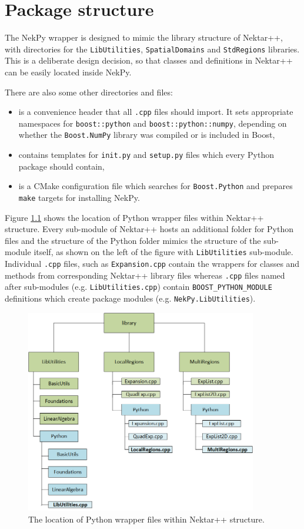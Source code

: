 \chapter{Package structure}

The NekPy wrapper is designed to mimic the library structure of Nektar++, with
directories for the \texttt{LibUtilities}, \texttt{SpatialDomains} and \texttt{StdRegions}
libraries. This is a deliberate design decision, so that classes and definitions
in Nektar++ can be easily located inside NekPy.

There are also some other directories and files:

\begin{itemize}
	\item {} is a convenience header that all 
		\texttt{.cpp} files should import. It sets appropriate namespaces for 
		\texttt{boost::python} and \texttt{boost::python::numpy}, depending on whether 
		the \texttt{Boost.NumPy} library was compiled or is included in Boost,
	\item {} contains templates for \texttt{init.py} and \texttt{setup.py}
		files which every Python package should contain,
	\item {} is a CMake configuration file which searches for
		\texttt{Boost.Python} and prepares \texttt{make} targets for installing NekPy.
\end{itemize}

Figure \ref{fig:package_str} shows the location of Python wrapper files within Nektar++ structure. 
Every sub-module of Nektar++ hosts an additional folder for Python files and the structure of the 
Python folder mimics the structure of the sub-module itself, as shown on the left of the figure 
with \texttt{LibUtilities} sub-module. Individual \texttt{.cpp} files, such as \texttt{Expansion.cpp} 
contain the wrappers for classes and methods from corresponding Nektar++ library files whereas 
\texttt{.cpp} files named after sub-modules (e.g. \texttt{LibUtilities.cpp}) contain 
\texttt{BOOST\_PYTHON\_MODULE} definitions which create package modules (e.g. \texttt{NekPy.LibUtilities}).

\begin{figure}[h!]
	\centering
    \includegraphics[width=0.9\textwidth]{img/package_str}
    \caption{The location of Python wrapper files within Nektar++ structure.}
    \label{fig:package_str}
\end{figure}